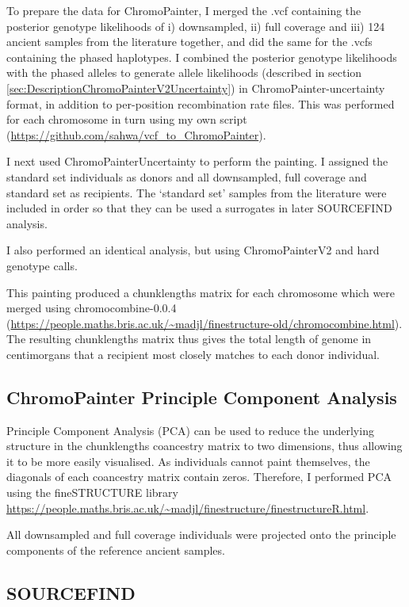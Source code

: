 {To prepare the data for ChromoPainter, I merged the .vcf containing the posterior genotype likelihoods of i) downsampled, ii) full coverage and iii) 124 ancient samples from the literature together, and did the same for the .vcfs containing the phased haplotypes.  I combined the posterior genotype likelihoods with the phased alleles to generate allele likelihoods (described in section \ref{sec:DescriptionChromoPainterV2Uncertainty}) in ChromoPainter-uncertainty format, in addition to per-position recombination rate files. This was performed for each chromosome in turn using my own script (\url{https://github.com/sahwa/vcf_to_ChromoPainter}).

I next used ChromoPainterUncertainty to perform the painting. I assigned the standard set individuals as donors and all downsampled, full coverage and standard set as recipients. The `standard set' samples from the literature were included in order so that they can be used a surrogates in later SOURCEFIND analysis.

I also performed an identical analysis, but using ChromoPainterV2 and hard genotype calls. 

This painting produced a chunklengths matrix for each chromosome which were merged using chromocombine-0.0.4 (\url{https://people.maths.bris.ac.uk/~madjl/finestructure-old/chromocombine.html}). The resulting chunklengths matrix thus gives the total length of genome in centimorgans that a recipient most closely matches to each donor individual. 

\subsection{ChromoPainter Principle Component Analysis}

Principle Component Analysis (PCA) can be used to reduce the underlying structure in the chunklengths coancestry matrix to two dimensions, thus allowing it to be more easily visualised. As individuals cannot paint themselves, the diagonals of each coancestry matrix contain zeros. Therefore, I performed PCA using the fineSTRUCTURE library \url{https://people.maths.bris.ac.uk/~madjl/finestructure/finestructureR.html}.

All downsampled and full coverage individuals were projected onto the principle components of the reference ancient samples. 


\subsection{SOURCEFIND}

}
